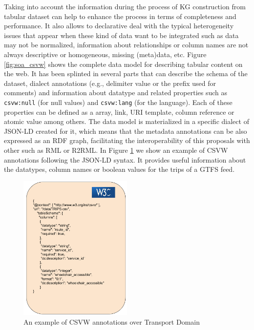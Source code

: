 Taking into account the information during the process of KG construction from tabular dataset can help to enhance the process in terms of completeness and performance. It also allows to declarative deal with the typical heterogeneity issues that appear when these kind of data want to be integrated such as data may not be normalized, information about relationships or column names are not always descriptive or homogeneous, missing (meta)data, etc. Figure \ref{fig:soa_csvw} shows the complete data model for describing tabular content on the web. It has been splinted in several parts that can describe the schema of the dataset, dialect annotations (e.g., delimiter value or the prefix used for comments) and information about datatype and related properties such as \texttt{csvw:null} (for null values) and \texttt{csvw:lang} (for the language). Each of these properties can be defined as a array, link, URI template, column reference or atomic value among others. The data model is materialized in a specific dialect of JSON-LD created for it, which means that the metadata annotations can be also expressed as an RDF graph, facilitating the interoperability of this proposals with other such as RML or R2RML. In Figure \ref{fig:soa_csvw_example} we show an example of CSVW annotations following the JSON-LD syntax. It provides useful information about the datatypes, column names or boolean values for the trips of a GTFS feed.

\begin{figure}[!ht]
\centering
\includegraphics[width=0.5\textwidth]{figures/state-of-the-art/CVSW example.pdf}
\caption{An example of CSVW annotations over Transport Domain}
\label{fig:soa_csvw_example}
\end{figure}





